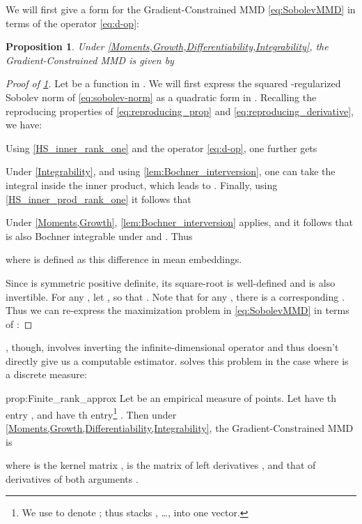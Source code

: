 \documentclass{article}
\newtheorem{prop}[lem]{Proposition}
\begin{document}
We will first give a form for the Gradient-Constrained MMD \eqref{eq:SobolevMMD}
in terms of the operator \eqref{eq:d-op}:
\begin{prop} \label{prop:dot_prod_expression}
Under \cref{Moments,Growth,Differentiability,Integrability},
the Gradient-Constrained MMD is given by
 
\end{prop}
\begin{proof}[Proof of \cref{prop:dot_prod_expression}]
Let  be a function in .
We will first express the squared -regularized Sobolev norm of 
\eqref{eq:sobolev-norm}
as a quadratic form in .
Recalling the reproducing properties
of \eqref{eq:reproducing_prop} and \eqref{eq:reproducing_derivative},
we have:

Using \cref{HS_inner_rank_one} and the operator \eqref{eq:d-op}, one further gets

Under \cref{Integrability}, and using \cref{lem:Bochner_interversion},
one can take the integral inside the inner product, which leads to
.
Finally, using \cref{HS_inner_prod_rank_one} it follows that


Under \cref{Moments,Growth}, \cref{lem:Bochner_interversion} applies,
and it follows that  is also Bochner integrable under  and .
Thus

where  is defined as this difference in mean embeddings.

Since  is symmetric positive definite,
its square-root  is well-defined and is also invertible.
For any ,
let ,
so that .
Note that for any , there is a corresponding .
Thus we can re-express the maximization problem in \eqref{eq:SobolevMMD} in terms of :

\end{proof}

, though, involves inverting the infinite-dimensional operator 
and thus doesn't directly give us a computable estimator.
 solves this problem in the case where  is a discrete measure:
\begin{repprop}{prop:Finite_rank_approx}
  Let  be an empirical measure of  points.
  Let  have th entry ,
  and  have th entry\footnote{We use  to denote ;
    thus  stacks , \dots,  into one vector.
  } .
  Then under \cref{Moments,Growth,Differentiability,Integrability},
  the Gradient-Constrained MMD is
  
  where  is the kernel matrix ,
   is the matrix of left derivatives ,
  and  that of derivatives of both arguments .
\end{repprop}
\end{document}
